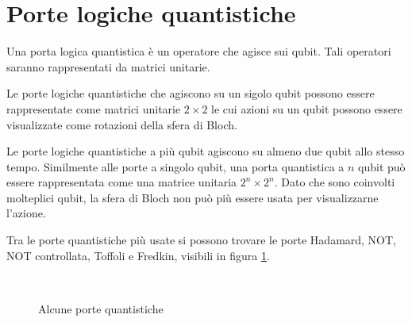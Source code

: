 \section{Porte logiche quantistiche} \label{sec:porte_quantistiche}

Una porta logica quantistica è un operatore che agisce sui qubit. Tali operatori 
saranno rappresentati da matrici unitarie. 

Le porte logiche quantistiche che agiscono su un sigolo qubit possono essere 
rappresentate come matrici unitarie $2 \times 2$ le cui azioni 
su un qubit possono essere visualizzate come rotazioni della sfera di Bloch. 

Le porte logiche quantistiche a più qubit agiscono su almeno due qubit 
allo stesso tempo. Similmente alle porte a singolo qubit, una porta quantistica 
a $n$ qubit può essere rappresentata come una matrice unitaria $2^n\times2^n$. 
Dato che sono coinvolti molteplici qubit, la sfera di Bloch non può più essere 
usata per visualizzarne l'azione. 

Tra le porte quantistiche più usate si possono trovare le porte Hadamard, 
NOT, NOT controllata, Toffoli e Fredkin, visibili in figura \ref{fig:porte_1}. 
\begin{figure}[h!]
    \myfloatalign
     \quad
     \quad
     \\ 
     \quad 
    
    \caption{Alcune porte quantistiche}
    \label{fig:porte_1}
\end{figure}

